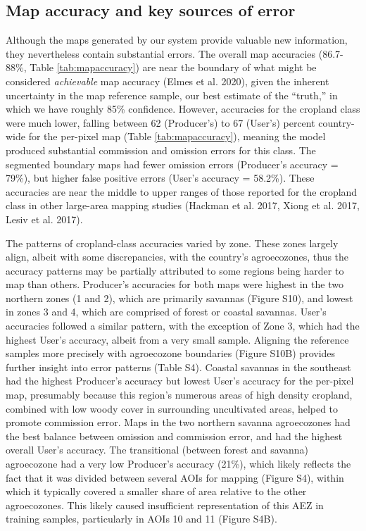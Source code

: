 \documentclass[11pt,a4paper]{article}
\begin{document}
\hypertarget{map-accuracy-and-key-sources-of-error}{%
\subsection{Map accuracy and key sources of
error}\label{map-accuracy-and-key-sources-of-error}}

Although the maps generated by our system provide valuable new
information, they nevertheless contain substantial errors. The overall
map accuracies (86.7-88\%, Table \ref{tab:mapaccuracy}) are near the
boundary of what might be considered \emph{achievable} map accuracy
(Elmes et al. 2020), given the inherent uncertainty in the map reference
sample, our best estimate of the ``truth,'' in which we have roughly
85\% confidence. However, accuracies for the cropland class were much
lower, falling between 62 (Producer's) to 67 (User's) percent
country-wide for the per-pixel map (Table \ref{tab:mapaccuracy}),
meaning the model produced substantial commission and omission errors
for this class. The segmented boundary maps had fewer omission errors
(Producer's accuracy = 79\%), but higher false positive errors (User's
accuracy = 58.2\%). These accuracies are near the middle to upper ranges
of those reported for the cropland class in other large-area mapping
studies (Hackman et al. 2017, Xiong et al. 2017, Lesiv et al. 2017).

The patterns of cropland-class accuracies varied by zone. These zones
largely align, albeit with some discrepancies, with the country's
agroecozones, thus the accuracy patterns may be partially attributed to
some regions being harder to map than others. Producer's accuracies for
both maps were highest in the two northern zones (1 and 2), which are
primarily savannas (Figure S10), and lowest in zones 3 and 4, which are
comprised of forest or coastal savannas. User's accuracies followed a
similar pattern, with the exception of Zone 3, which had the highest
User's accuracy, albeit from a very small sample. Aligning the reference
samples more precisely with agroecozone boundaries (Figure S10B)
provides further insight into error patterns (Table S4). Coastal
savannas in the southeast had the highest Producer's accuracy but lowest
User's accuracy for the per-pixel map, presumably because this region's
numerous areas of high density cropland, combined with low woody cover
in surrounding uncultivated areas, helped to promote commission error.
Maps in the two northern savanna agroecozones had the best balance
between omission and commission error, and had the highest overall
User's accuracy. The transitional (between forest and savanna)
agroecozone had a very low Producer's accuracy (21\%), which likely
reflects the fact that it was divided between several AOIs for mapping
(Figure S4), within which it typically covered a smaller share of area
relative to the other agroecozones. This likely caused insufficient
representation of this AEZ in training samples, particularly in AOIs 10
and 11 (Figure S4B).
\end{document}
